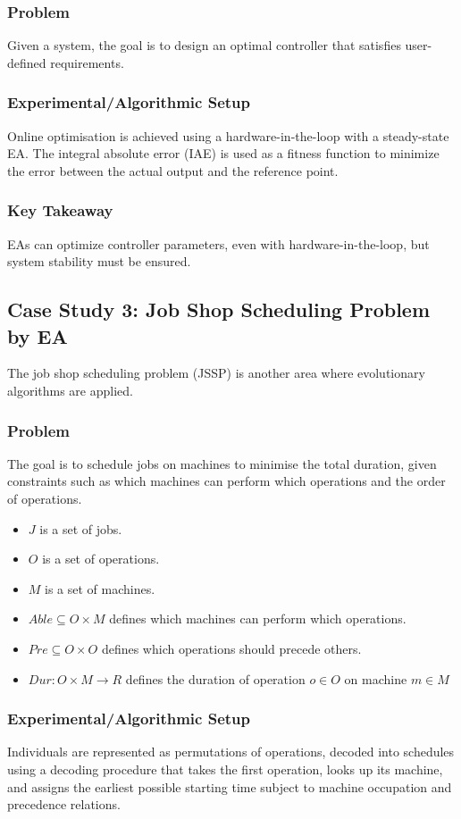 \subsubsection*{Problem}
Given a system, the goal is to design an optimal controller that satisfies user-defined requirements.
\subsubsection*{Experimental/Algorithmic Setup}
Online optimisation is achieved using a hardware-in-the-loop with a steady-state EA. The integral absolute error (IAE) is used as a fitness function to minimize the error between the actual output and the reference point.
\subsubsection*{Key Takeaway}
EAs can optimize controller parameters, even with hardware-in-the-loop, but system stability must be ensured.

\subsection*{Case Study 3: Job Shop Scheduling Problem by EA}
The job shop scheduling problem (JSSP) is another area where evolutionary algorithms are applied.
\subsubsection*{Problem}
The goal is to schedule jobs on machines to minimise the total duration, given constraints such as which machines can perform which operations and the order of operations.
\begin{itemize}
    \item $J$ is a set of jobs.
    \item $O$ is a set of operations.
    \item $M$ is a set of machines.
    \item $Able \subseteq O \times M$ defines which machines can perform which operations.
    \item $Pre \subseteq O \times O$ defines which operations should precede others.
    \item $Dur: O \times M \rightarrow R$ defines the duration of operation $o \in O$ on machine $m \in M$
\end{itemize}
\subsubsection*{Experimental/Algorithmic Setup}
Individuals are represented as permutations of operations, decoded into schedules using a decoding procedure that takes the first operation, looks up its machine, and assigns the earliest possible starting time subject to machine occupation and precedence relations.
